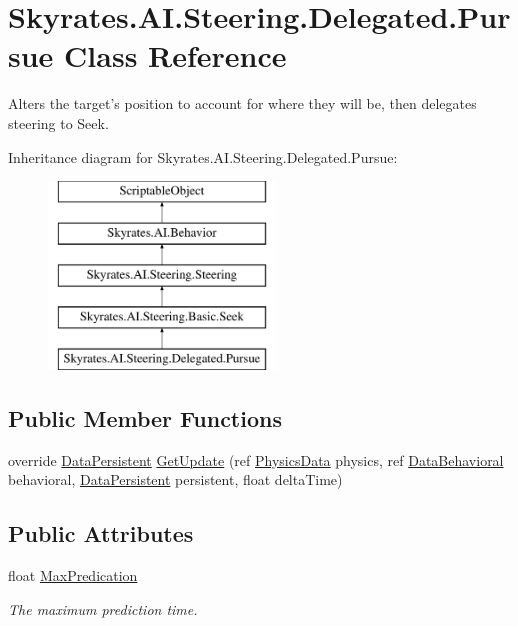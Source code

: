 \hypertarget{class_skyrates_1_1_a_i_1_1_steering_1_1_delegated_1_1_pursue}{\section{Skyrates.\-A\-I.\-Steering.\-Delegated.\-Pursue Class Reference}
\label{class_skyrates_1_1_a_i_1_1_steering_1_1_delegated_1_1_pursue}
}


Alters the target's position to account for where they will be, then delegates steering to Seek.  


Inheritance diagram for Skyrates.\-A\-I.\-Steering.\-Delegated.\-Pursue\-:\begin{figure}[H]
\begin{center}
\leavevmode
\includegraphics[height=5.000000cm]{class_skyrates_1_1_a_i_1_1_steering_1_1_delegated_1_1_pursue}
\end{center}
\end{figure}
\subsection*{Public Member Functions}
\begin{DoxyCompactItemize}
\item 
override \hyperlink{class_skyrates_1_1_a_i_1_1_behavior_1_1_data_persistent}{Data\-Persistent} \hyperlink{class_skyrates_1_1_a_i_1_1_steering_1_1_delegated_1_1_pursue_a85e6b58d0a48e496dfe3b60c2b4a4a82}{Get\-Update} (ref \hyperlink{class_skyrates_1_1_physics_1_1_physics_data}{Physics\-Data} physics, ref \hyperlink{class_skyrates_1_1_a_i_1_1_behavior_1_1_data_behavioral}{Data\-Behavioral} behavioral, \hyperlink{class_skyrates_1_1_a_i_1_1_behavior_1_1_data_persistent}{Data\-Persistent} persistent, float delta\-Time)
\end{DoxyCompactItemize}
\subsection*{Public Attributes}
\begin{DoxyCompactItemize}
\item 
float \hyperlink{class_skyrates_1_1_a_i_1_1_steering_1_1_delegated_1_1_pursue_a64f7f741d359c3174e28c7161d104b0c}{Max\-Predication}
\begin{DoxyCompactList}\small\item\em The maximum prediction time. \end{DoxyCompactList}\end{DoxyCompactItemize}
